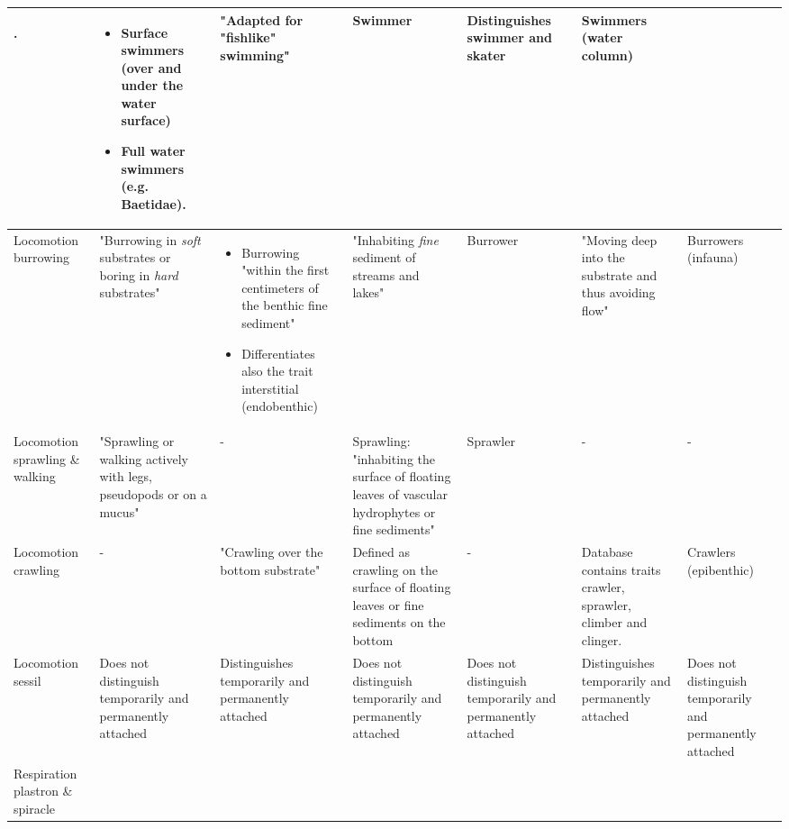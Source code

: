 \documentclass[../Draft_harmonization_paper.tex]{subfiles}
\begin{document}
\begin{landscape}
\begin{longtable}{m{1.8cm}|m{3cm}|m{3cm}|m{3cm}|m{3cm}|m{3cm}|m{3cm}}
\begin{itemize}
        \end{itemize}. &
        \begin{itemize}
            \item Surface swimmers (over and under the water surface)
            \item Full water swimmers (e.g. Baetidae).
        \end{itemize} & 
        "Adapted for "fishlike" swimming" & 
        Swimmer & 
        Distinguishes swimmer and skater & 
        Swimmers (water column)
        \\
        \midrule
        Locomotion burrowing & 
        "Burrowing in \textit{soft} substrates or boring in \textit{hard} substrates" & 
        \begin{itemize}
            \item Burrowing "within the first centimeters of the benthic fine sediment"
            \item Differentiates also the trait interstitial (endobenthic)
        \end{itemize} & 
        "Inhabiting \textit{fine} sediment of streams and lakes" &
        Burrower & 
        "Moving deep into the substrate and thus avoiding flow" &
        Burrowers (infauna)
        \\
        \midrule
        Locomotion sprawling \& walking & 
        "Sprawling or walking actively with legs, pseudopods or on a mucus" &
        - & 
        Sprawling: "inhabiting the surface of floating leaves of vascular hydrophytes or fine sediments" & 
        Sprawler &
        - & 
        - \\
        \midrule
        Locomotion crawling & 
        - &
        "Crawling over the bottom substrate" & 
        Defined as crawling on the surface of floating leaves or fine sediments on the bottom & 
        - & 
        Database contains traits crawler, 
        sprawler, climber and clinger. &
        Crawlers (epibenthic) \\
        \midrule
        Locomotion sessil & 
        Does not distinguish temporarily and permanently attached & 
        Distinguishes temporarily and permanently attached & 
        Does not distinguish temporarily and permanently attached & 
        Does not distinguish temporarily and permanently attached & 
        Distinguishes temporarily and permanently attached & 
        Does not distinguish temporarily and permanently attached \\
        \toprule[.1em]
        Respiration plastron \& spiracle & 

\end{longtable}
\end{landscape}
\end{document}
